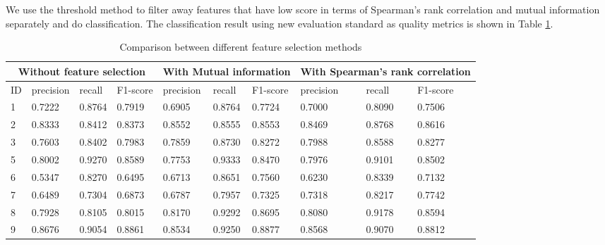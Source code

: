 \documentclass[article]{article}
\begin{document}
We use the threshold method to filter away features that have low score in terms of Spearman's rank correlation and mutual information separately and do classification. The classification result using new evaluation standard as quality metrics is shown in Table \ref{feature_s}.

 \begin{table}
	\begin{center}
		\begin{tabular}{  |p{0.5cm}||p{1.3cm}|p{1.3cm}|p{1.3cm}|p{1.3cm}|p{1.3cm}|p{1.3cm}|p{1.3cm}|p{1.3cm}|p{1.3cm}| }
			\hline
			\multicolumn{4}{|c|}{Without feature selection} &\multicolumn{3}{|c|}{With Mutual information}&\multicolumn{3}{|c|}{With Spearman's rank correlation}  \\
			
			\hline
			ID &  precision &  recall &  F1-score &  precision &  recall &  F1-score &  precision &  recall &  F1-score\\
			\hline
			1 & 0.7222 &0.8764 & 0.7919 & 0.6905 &0.8764 & 0.7724 & 0.7000 &0.8090 & 0.7506 \\
			2 & 0.8333 &0.8412 & 0.8373  &  0.8552 &0.8555 & 0.8553 &  0.8469 &0.8768 & 0.8616\\ 
			
			3 & 0.7603 &0.8402 & 0.7983&  0.7859 &0.8730 & 0.8272 & 0.7988 &0.8588 & 0.8277 \\   
			
			5 & 0.8002 &0.9270 & 0.8589 & 0.7753 &0.9333 & 0.8470 & 0.7976 &0.9101 & 0.8502 \\
			
			6 & 0.5347 &0.8270 & 0.6495 & 0.6713 &0.8651 &  0.7560 & 0.6230 &0.8339 & 0.7132 \\
			
			7 & 0.6489 &0.7304 & 0.6873  & 0.6787 &0.7957 & 0.7325  &  0.7318 &0.8217 & 0.7742\\
			
			8 & 0.7928 &0.8105 & 0.8015  & 0.8170 &0.9292 & 0.8695   & 0.8080 &0.9178 & 0.8594   \\	
			
			9 & 0.8676 &0.9054 & 0.8861  & 0.8534 &0.9250 & 0.8877 & 0.8568 &0.9070 & 0.8812\\
			\hline
		\end{tabular}
		\caption{Comparison between different feature selection methods}
		\label{feature_s}
	\end{center}
\end{table}
\end{document}
